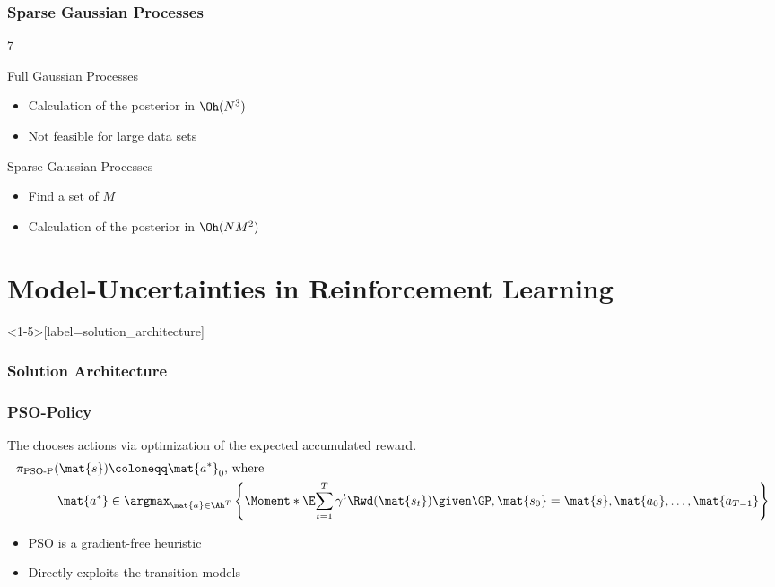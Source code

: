 \begin{frame}[label=gp_sparse]
    \frametitle{Sparse Gaussian Processes}

    \begin{overlayarea}{\textwidth}{7\baselineskip}
         {
            \begin{block}{Full Gaussian Processes}
                \begin{itemize}
                    \item Calculation of the posterior in $\Oh(N^3)$
                    \item Not feasible for large data sets
                \end{itemize}
            \end{block}
        }
         {
            \begin{block}{Sparse Gaussian Processes}
                \begin{itemize}
                    \item Find a set of $M$ 
                    \item Calculation of the posterior in $\Oh(NM^2)$
                \end{itemize}
            \end{block}
        }
    \end{overlayarea}
    \vfill
    \centering
\end{frame}

\section{Model-Uncertainties in Reinforcement Learning}
\begin{frame}<1-5>[label=solution_architecture]
    \frametitle{Solution Architecture}

    \centering
    
\end{frame}

\begin{frame}[label=solution_psop]
    \frametitle{PSO-Policy}

    \begin{definition}
        \label{def:psop}
        The  chooses actions via optimization of the expected accumulated reward.
        \begin{align}
            \pi_{\text{PSO-P}}(\mat{s}) &\coloneqq \mat{a^\ast}_0\text{, where} \\
            \mat{a^\ast} &\in \argmax_{\mat{a} \in \Ah^T} \left\{ \Moment*{\E}{\sum_{t=1}^T \gamma^t \Rwd(\mat{s_t}) \given \GP, \mat{s_0} = \mat{s}, \mat{a_0}, \dots, \mat{a_{T-1}}} \right\}
        \end{align}
    \end{definition}
    \begin{itemize}
        \item PSO is a gradient-free heuristic
        \item Directly exploits the transition models
    \end{itemize}
\end{frame}

